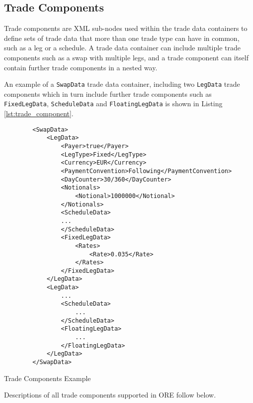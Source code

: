 \subsection{Trade Components}

Trade components are XML sub-nodes used within the trade data containers to define sets of trade data that more than one
trade type can have in common, such as a leg or a schedule. A trade data container can include multiple trade components
such as a swap with multiple legs, and a trade component can itself contain further trade components in a nested way.

\vspace{1em}

An example of a \lstinline!SwapData! trade data container, including two \lstinline!LegData! trade components which in
turn include further trade components such as \lstinline!FixedLegData!, \lstinline!ScheduleData! and
\lstinline!FloatingLegData! is shown in Listing \ref{lst:trade_component}.

\begin{listing}[H]
\begin{verbatim}
        <SwapData>
            <LegData>
                <Payer>true</Payer>
                <LegType>Fixed</LegType>
                <Currency>EUR</Currency>
                <PaymentConvention>Following</PaymentConvention>
                <DayCounter>30/360</DayCounter>
                <Notionals>
                    <Notional>1000000</Notional>
                </Notionals>
                <ScheduleData>
                ...
                </ScheduleData>
                <FixedLegData>
                    <Rates>
                        <Rate>0.035</Rate>
                    </Rates>
                </FixedLegData>
            </LegData>
            <LegData>
                ...
                <ScheduleData>
                    ...
                </ScheduleData>
                <FloatingLegData>
                    ...
                </FloatingLegData>
            </LegData>
        </SwapData>
\end{verbatim}
\caption{Trade Components Example}
\label{lst:trade_component}
\end{listing}

Descriptions of all trade components supported in ORE follow below.


